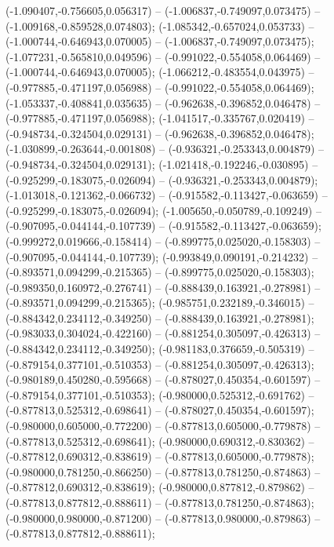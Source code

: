  (-1.090407,-0.756605,0.056317) -- (-1.006837,-0.749097,0.073475) -- (-1.009168,-0.859528,0.074803);
 (-1.085342,-0.657024,0.053733) -- (-1.000744,-0.646943,0.070005) -- (-1.006837,-0.749097,0.073475);
 (-1.077231,-0.565810,0.049596) -- (-0.991022,-0.554058,0.064469) -- (-1.000744,-0.646943,0.070005);
 (-1.066212,-0.483554,0.043975) -- (-0.977885,-0.471197,0.056988) -- (-0.991022,-0.554058,0.064469);
 (-1.053337,-0.408841,0.035635) -- (-0.962638,-0.396852,0.046478) -- (-0.977885,-0.471197,0.056988);
 (-1.041517,-0.335767,0.020419) -- (-0.948734,-0.324504,0.029131) -- (-0.962638,-0.396852,0.046478);
 (-1.030899,-0.263644,-0.001808) -- (-0.936321,-0.253343,0.004879) -- (-0.948734,-0.324504,0.029131);
 (-1.021418,-0.192246,-0.030895) -- (-0.925299,-0.183075,-0.026094) -- (-0.936321,-0.253343,0.004879);
 (-1.013018,-0.121362,-0.066732) -- (-0.915582,-0.113427,-0.063659) -- (-0.925299,-0.183075,-0.026094);
 (-1.005650,-0.050789,-0.109249) -- (-0.907095,-0.044144,-0.107739) -- (-0.915582,-0.113427,-0.063659);
 (-0.999272,0.019666,-0.158414) -- (-0.899775,0.025020,-0.158303) -- (-0.907095,-0.044144,-0.107739);
 (-0.993849,0.090191,-0.214232) -- (-0.893571,0.094299,-0.215365) -- (-0.899775,0.025020,-0.158303);
 (-0.989350,0.160972,-0.276741) -- (-0.888439,0.163921,-0.278981) -- (-0.893571,0.094299,-0.215365);
 (-0.985751,0.232189,-0.346015) -- (-0.884342,0.234112,-0.349250) -- (-0.888439,0.163921,-0.278981);
 (-0.983033,0.304024,-0.422160) -- (-0.881254,0.305097,-0.426313) -- (-0.884342,0.234112,-0.349250);
 (-0.981183,0.376659,-0.505319) -- (-0.879154,0.377101,-0.510353) -- (-0.881254,0.305097,-0.426313);
 (-0.980189,0.450280,-0.595668) -- (-0.878027,0.450354,-0.601597) -- (-0.879154,0.377101,-0.510353);
 (-0.980000,0.525312,-0.691762) -- (-0.877813,0.525312,-0.698641) -- (-0.878027,0.450354,-0.601597);
 (-0.980000,0.605000,-0.772200) -- (-0.877813,0.605000,-0.779878) -- (-0.877813,0.525312,-0.698641);
 (-0.980000,0.690312,-0.830362) -- (-0.877812,0.690312,-0.838619) -- (-0.877813,0.605000,-0.779878);
 (-0.980000,0.781250,-0.866250) -- (-0.877813,0.781250,-0.874863) -- (-0.877812,0.690312,-0.838619);
 (-0.980000,0.877812,-0.879862) -- (-0.877813,0.877812,-0.888611) -- (-0.877813,0.781250,-0.874863);
 (-0.980000,0.980000,-0.871200) -- (-0.877813,0.980000,-0.879863) -- (-0.877813,0.877812,-0.888611);
